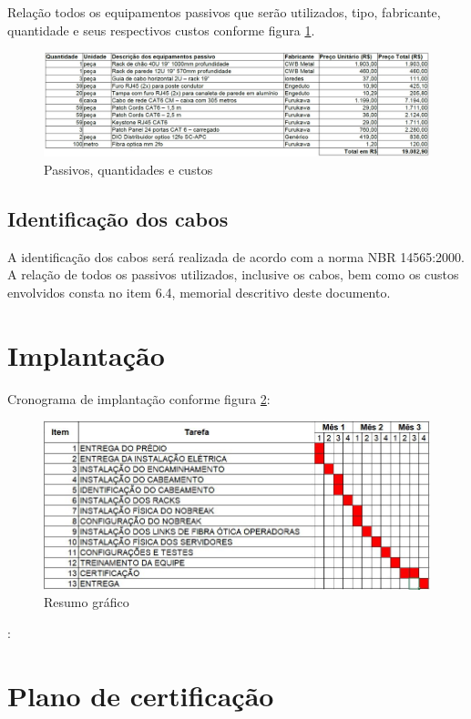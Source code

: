 \documentclass[	DIV=calc,%
							paper=a4,%
							fontsize=12pt,%
							onecolumn]{scrartcl}	 					%
\begin{document}
Relação todos os equipamentos passivos que serão utilizados, tipo, fabricante, quantidade e seus respectivos custos conforme figura \ref{figura8}.  
\begin{figure}[H]
	\centering
	\includegraphics[width=\textwidth]{figura8}
	\caption{Passivos, quantidades e custos}
	\label{figura8}
\end{figure}



\subsection{Identificação dos cabos}
A identificação dos cabos será realizada de acordo com a norma NBR 14565:2000. A relação de todos os passivos utilizados, inclusive os cabos, bem como os custos envolvidos consta no item 6.4, memorial descritivo deste documento. 

\section{Implantação}
Cronograma de implantação conforme figura \ref{cronograma}:

\begin{figure}[h]
	\centering
	\includegraphics[width=\textwidth]{cronograma}
	\caption{Resumo gráfico}
	\label{cronograma}	
\end{figure}:


\section{Plano de certificação}
\end{document}
